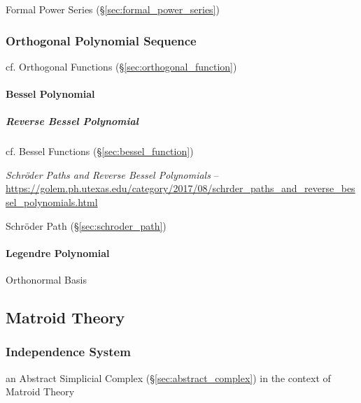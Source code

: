 \fist Formal Power Series (\S\ref{sec:formal_power_series})



\subsubsection{Orthogonal Polynomial Sequence}
\label{sec:orthogonal_polynomial_sequence}

\fist cf. Orthogonal Functions (\S\ref{sec:orthogonal_function})



\paragraph{Bessel Polynomial}\label{sec:bessel_polynomial}\hfill

\subparagraph{Reverse Bessel Polynomial}\label{sec:reverse_bessel_polynomial}
\hfill

cf. Bessel Functions (\S\ref{sec:bessel_function})

\emph{Schr\"oder Paths and Reverse Bessel Polynomials} --
\url{https://golem.ph.utexas.edu/category/2017/08/schrder_paths_and_reverse_bessel_polynomials.html}

Schr\"oder Path (\S\ref{sec:schroder_path})



\paragraph{Legendre Polynomial}\label{sec:legendre_polynomial}\hfill

Orthonormal Basis



\subsection{Matroid Theory}\label{sec:matroid_theory}

\subsubsection{Independence System}\label{sec:independence_system}

an Abstract Simplicial Complex (\S\ref{sec:abstract_complex}) in the context of
Matroid Theory



